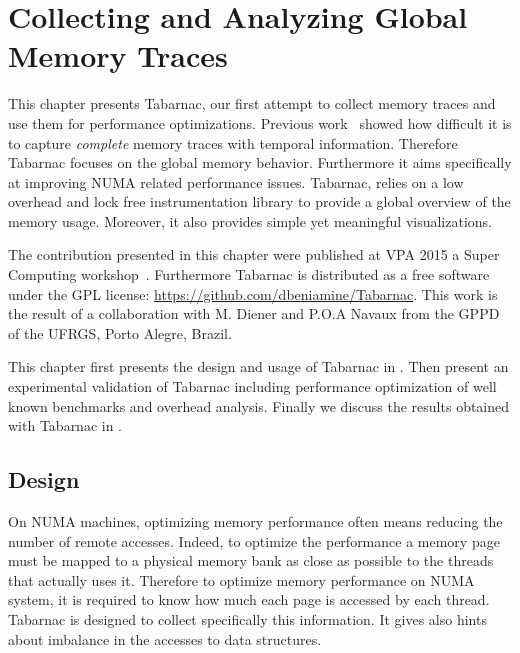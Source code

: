 \chapter{Collecting and Analyzing Global Memory Traces}
\label{chap:tabarnac}

This chapter presents \gls{Tabarnac}, our first attempt to collect memory traces and use them for performance optimizations.
Previous work~\cite{Beniamine13Cartographier} showed how difficult it is to capture \emph{complete} memory traces with temporal information.
Therefore \gls{Tabarnac} focuses on the global memory behavior.
Furthermore it aims specifically at improving \gls{NUMA} related performance issues.
\gls{Tabarnac}, relies on a low overhead and lock free instrumentation library to provide a global overview of the memory usage.
Moreover,  it also provides simple yet meaningful visualizations.

The contribution presented in this chapter were published at \gls{VPA} 2015 a Super Computing workshop~\cite{Beniamine15TABARNAC}.
Furthermore \gls{Tabarnac} is distributed as a free software under the \gls{GPL} license: \url{https://github.com/dbeniamine/Tabarnac}.
This work is the result of a collaboration with M. Diener and P.O.A Navaux from the \gls{GPPD} of the \gls{UFRGS}, Porto Alegre, Brazil.

This chapter first presents the design and usage of \gls{Tabarnac} in .
Then  present an experimental validation of \gls{Tabarnac} including performance optimization of well known benchmarks and overhead analysis.
Finally we discuss the results obtained with \gls{Tabarnac} in .

\section{Design}
\label{sec:tab-design}

On \gls{NUMA} machines, optimizing memory performance often means reducing the number of remote accesses.
Indeed, to optimize the performance a memory page must be mapped to a physical memory bank as close as possible to the threads that actually uses it.
Therefore to optimize memory performance on \gls{NUMA} system, it is required to know how much each page is accessed by each thread.
\gls{Tabarnac} is designed to collect specifically this information.
It gives also hints about imbalance in the accesses to data structures.

